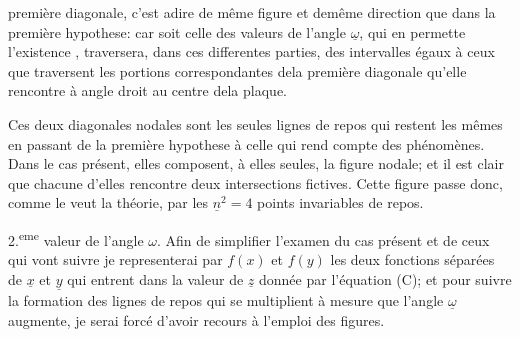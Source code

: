 \documentclass[11pt,a4paper]{article}
\begin{document}

première diagonale, c'est adire de même figure et demême
direction que dans la première hypothese: car   soit celle des
valeurs de l'angle $\underline{\omega}$, qui en permette l'existence ,   traversera,
dans ces differentes parties, des intervalles égaux à ceux que
traversent les portions correspondantes dela première diagonale
qu'elle rencontre à angle droit au centre dela plaque.

Ces deux diagonales nodales sont les seules lignes de repos
qui restent les mêmes en passant de la première hypothese
à celle qui rend compte des phénomènes. Dans le cas
présent, elles composent, à elles seules, la figure nodale; et
il est clair que chacune d'elles rencontre deux intersections
fictives. Cette figure passe donc, comme le veut la
théorie, par les $\underline{n}^2 = 4$ points invariables de repos.

2.\textsuperscript{eme} valeur de l'angle $\omega$.  Afin de simplifier l'examen
du cas présent et de ceux qui vont suivre je representerai
par $f(x)$ et $f(y)$ les deux fonctions séparées de $\underline{x}$ et $\underline{y}$
qui entrent dans la valeur de $\underline{z}$ donnée par l'équation
(C); et pour suivre la formation des lignes de repos
qui se multiplient à mesure que l'angle $\underline{\omega}$ augmente,
je serai forcé d'avoir recours à l'emploi des figures.
\end{document}
